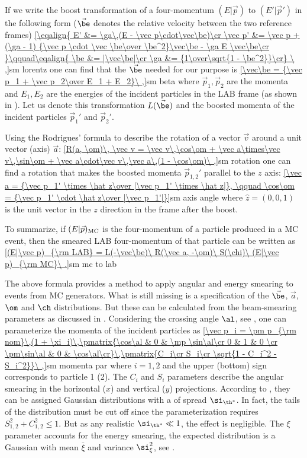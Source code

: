 If we write the boost transformation of a four-momentum $(E|\vec p)$ to $(E'|\vec p')$ in the following form ($\vec\be$ denotes the relative velocity between the two reference frames)
\eqref{\eqalign{
E'      &= \ga\,(E - \vec p\cdot\vec\be)\cr
\vec p' &= \vec p  +  (\ga - 1) {\vec p \cdot \vec \be\over \be^2}\vec\be - \ga E \vec\be\cr
}\qquad\eqalign{
\be &= |\vec\be|\cr
\ga &= {1\over\sqrt{1 - \be^2}}\cr}
\ ,}{sm lorentz}
one can find that the $\vec\be$ needed for our purpose is
\eqref{\vec\be = {\vec p_1 + \vec p_2\over E_1 + E_2}\ ,}{sm beta}
where $\vec p_1, \vec p_2$ are the momenta and $E_1, E_2$ are the energies of the incident particles in the LAB frame (as shown in ). Let us denote this transformation $L(\vec\be)$ and the boosted momenta of the incident particles $\vec p_1'$ and $\vec p_2'$.

Using the Rodrigues' formula to describe the rotation of a vector $\vec v$ around a unit vector (axis) $\vec a$:
\eqref{R(a, \om)\, \vec v = \vec v\,\cos\om + \vec a\times\vec v\,\sin\om + \vec a\cdot\vec v\,\vec a\,(1 - \cos\om)\ ,}{sm rotation}
one can find a rotation that makes the boosted momenta $\vec p_{1, 2}'$ parallel to the $z$ axis:
\eqref{\vec a = {\vec p_1' \times \hat z\over |\vec p_1' \times \hat z|}, \qquad \cos\om = {\vec p_1' \cdot \hat z\over |\vec p_1'|}}{sm axis angle}
where $\hat z = (0, 0, 1)$ is the unit vector in the $z$ direction in the frame after the boost.

To summarize, if $(E|\vec p)_{\rm MC}$ is the four-momentum of a particle produced in a MC event, then the smeared LAB four-momentum of that particle can be written as
\eqref{(E|\vec p)_{\rm LAB} = L(-\vec\be)\ R(\vec a, -\om)\ S(\chi)\ (E|\vec p)_{\rm MC}\ .}{sm mc to lab}


The above formula provides a method to apply angular and energy smearing to events from MC generators. What is still missing is a specification of the $\vec\be$, $\vec a$, $\om$ and $\ch$ distributions. But these can be calculated from the beam-smearing parameters as discussed in . Considering the crossing angle $\al$, see , one can parameterize the momenta of the incident particles as
\eqref{\vec p_i = \pm p_{\rm nom}\,(1 + \xi_i)\,\pmatrix{\cos\al & 0 & \mp \sin\al\cr 0 & 1 & 0 \cr \pm\sin\al & 0 & \cos\al\cr}\,\pmatrix{C_i\cr S_i\cr \sqrt{1 - C_i^2 - S_i^2}}\ ,}{sm momenta par}
where $i = 1, 2$ and the upper (bottom) sign corresponds to particle 1 (2). The $C_i$ and $S_i$ parameters describe the angular smearing in the horizontal ($x$) and vertical ($y$) projections. According to , they can be assigned Gaussian distributions  with a of spread $\si_{\th^*}$. In fact, the tails of the distribution must be cut off since the parameterization requires $S_{1,2}^2 + C_{1,2}^2 \leq 1$. But as any realistic $\si_{\th^*} \ll 1$, the effect is negligible. The $\xi$ parameter accounts for the energy smearing, the expected distribution is a Gaussian with mean $\bar\xi$ and variance $\si_\xi^2$, see .

